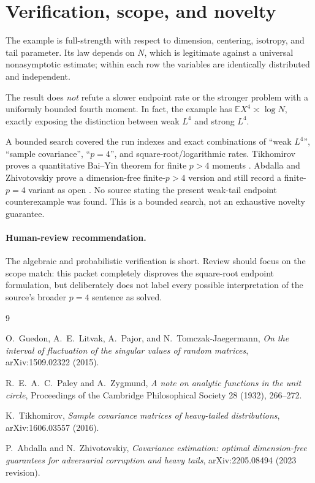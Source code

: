 \documentclass[11pt]{article}
\newcommand{\Ee}{\mathbb{E}}
\begin{document}
\section{Verification, scope, and novelty}

The example is full-strength with respect to dimension, centering, isotropy,
and tail parameter.  Its law depends on $N$, which is legitimate against a
universal nonasymptotic estimate; within each row the variables are identically
distributed and independent.

The result does \emph{not} refute a slower endpoint rate or the stronger
problem with a uniformly bounded fourth moment.  In fact, the example has
$\Ee X^4\asymp\log N$, exactly exposing the distinction between weak $L^4$
and strong $L^4$.

A bounded search covered the run indexes and exact combinations of
``weak $L^4$'', ``sample covariance'', ``$p=4$'', and square-root/logarithmic
rates.  Tikhomirov proves a quantitative Bai--Yin theorem for finite
$p>4$ moments \cite{Tikhomirov}.  Abdalla and Zhivotovskiy prove a
dimension-free finite-$p>4$ version and still record a finite-$p=4$ variant as
open \cite{AZ}.  No source stating the present weak-tail endpoint
counterexample was found.  This is a bounded search, not an exhaustive
novelty guarantee.

\paragraph{Human-review recommendation.}
The algebraic and probabilistic verification is short.  Review should focus on
the scope match: this packet completely disproves the square-root endpoint
formulation, but deliberately does not label every possible interpretation of
the source's broader $p=4$ sentence as solved.

\begin{thebibliography}{9}

O.~Guedon, A.~E.~Litvak, A.~Pajor, and N.~Tomczak-Jaegermann,
\emph{On the interval of fluctuation of the singular values of random
matrices}, arXiv:1509.02322 (2015).

R.~E.~A.~C.~Paley and A.~Zygmund,
\emph{A note on analytic functions in the unit circle},
Proceedings of the Cambridge Philosophical Society 28 (1932), 266--272.

K.~Tikhomirov,
\emph{Sample covariance matrices of heavy-tailed distributions},
arXiv:1606.03557 (2016).

P.~Abdalla and N.~Zhivotovskiy,
\emph{Covariance estimation: optimal dimension-free guarantees for
adversarial corruption and heavy tails}, arXiv:2205.08494 (2023 revision).

\end{thebibliography}
\end{document}
